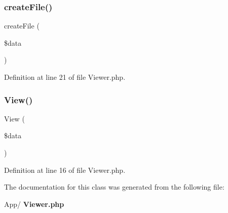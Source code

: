 \subsubsection{create\+File()}
{\footnotesize\ttfamily create\+File (\begin{DoxyParamCaption}\item[{}]{\$data }\end{DoxyParamCaption})}



Definition at line 21 of file Viewer.\+php.

\mbox{\label{class_app_1_1_viewer_ab1d271f3b152feb68aec05dd99ce8e66}} 
\subsubsection{View()}
{\footnotesize\ttfamily View (\begin{DoxyParamCaption}\item[{}]{\$data }\end{DoxyParamCaption})}



Definition at line 16 of file Viewer.\+php.



The documentation for this class was generated from the following file\+:\begin{DoxyCompactItemize}
\item 
App/\textbf{ Viewer.\+php}\end{DoxyCompactItemize}
